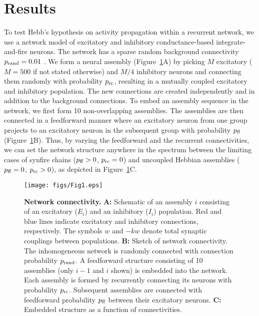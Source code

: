 \section{Results}
  To test Hebb's hypothesis on activity propagation within a recurrent network,
  we use a network model of excitatory and inhibitory conductance-based
  integrate-and-fire neurons. The network has a sparse random background
  connectivity $p_{\rm rand}=0.01$ \citep{Guzman2016}. We form a neural assembly (Figure~\ref{fig1}A)
  by picking $M$ excitatory ($M=500$ if not stated otherwise) and $M/4$
  inhibitory neurons and connecting them randomly with probability $p_{\rm
  rc}$, resulting in a mutually coupled excitatory and inhibitory population.
  The new connections are created independently and in addition to the
  background connections. To embed an assembly sequence in the network, we
  first form 10 non-overlapping assemblies. The assemblies are then connected
  in a feedforward manner where an excitatory neuron from one group projects to
  an excitatory neuron in the subsequent group with probability $p_{\rm ff}$
  (Figure~\ref{fig1}B). Thus, by varying the feedforward and the recurrent
  connectivities, we can set the network structure anywhere in the spectrum
  between the limiting cases of synfire chains ($p_{\rm ff}>0$, $p_{\rm rc} =
  0$) and uncoupled Hebbian assemblies ($p_{\rm ff} = 0$, $p_{\rm rc}>0$), as
  depicted in Figure~\ref{fig1}C.

    \begin{figure}[!h]
      \texttt{[image: figs/Fig1.eps]}
      \caption{{\bf Network connectivity.}
        \textbf{A:} Schematic of an assembly $i$ consisting of an excitatory
        ($E_i$) and an inhibitory ($I_i$) population. Red and blue lines
        indicate excitatory and inhibitory connections, respectively. The
        symbols $w$ and $-kw$ denote total synaptic couplings between
        populations.
        \textbf{B:} Sketch of network connectivity. The inhomogeneous network
        is randomly connected with connection probability $p_{\rm rand}$. A
        feedforward structure consisting of 10 assemblies (only $i-1$ and $i$
        shown) is embedded into the network. Each assembly is formed by
        recurrently connecting its neurons with probability $p_{\rm rc}$.
        Subsequent assemblies are connected with feedforward probability
        $p_{\rm ff}$ between their excitatory neurons.
        \textbf{C:} Embedded structure as a function of connectivities.
      }
      \label{fig1}
    \end{figure}

